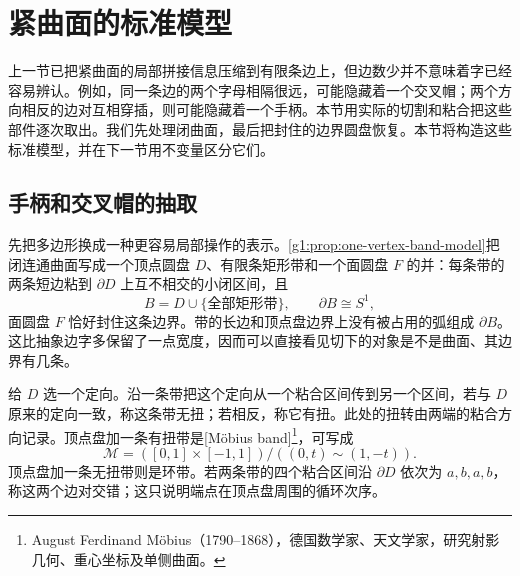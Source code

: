 
% 
% 

\section{紧曲面的标准模型}
\label{g1:sec:0604}

上一节已把紧曲面的局部拼接信息压缩到有限条边上，但边数少并不意味着字已经容易辨认。例如，同一条边的两个字母相隔很远，可能隐藏着一个交叉帽；两个方向相反的边对互相穿插，则可能隐藏着一个手柄。本节用实际的切割和粘合把这些部件逐次取出。我们先处理闭曲面，最后把封住的边界圆盘恢复。本节将构造这些标准模型，并在下一节用不变量区分它们。

\subsection{手柄和交叉帽的抽取}
\label{g1:subsec:0604:01}

先把多边形换成一种更容易局部操作的表示。\cref{g1:prop:one-vertex-band-model}把闭连通曲面写成一个顶点圆盘 \(D\)、有限条矩形带和一个面圆盘 \(F\) 的并：每条带的两条短边粘到 \(\partial D\) 上互不相交的小闭区间，且
\[
	B=D\cup\{\text{全部矩形带}\},\qquad \partial B\cong S^1,
\]
面圆盘 \(F\) 恰好封住这条边界。带的长边和顶点盘边界上没有被占用的弧组成 \(\partial B\)。这比抽象边字多保留了一点宽度，因而可以直接看见切下的对象是不是曲面、其边界有几条。

给 \(D\) 选一个定向。沿一条带把这个定向从一个粘合区间传到另一个区间，若与 \(D\) 原来的定向一致，称这条带无扭；若相反，称它有扭。此处的扭转由两端的粘合方向记录。顶点盘加一条有扭带是[Möbius band]\footnote{August Ferdinand Möbius（1790--1868），德国数学家、天文学家，研究射影几何、重心坐标及单侧曲面。}，可写成
\[
	\mathcal M=([0,1]\times[-1,1])/((0,t)\sim(1,-t)).
\]
顶点盘加一条无扭带则是环带。若两条带的四个粘合区间沿 \(\partial D\) 依次为 \(a,b,a,b\)，称这两个边对交错；这只说明端点在顶点盘周围的循环次序。


